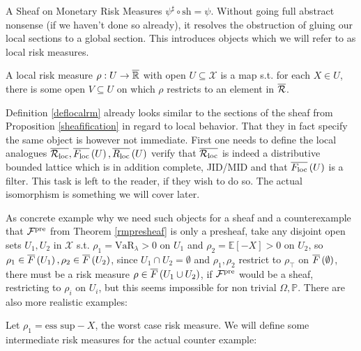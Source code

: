 \begin{subsection}{A Sheaf on Monetary Risk Measures}
    \( \psi^\sharp \circ \text{sh} = \psi \).
    Without going full abstract nonsense (if we haven't done so already),
    it resolves the obstruction of gluing our local sections to a global section. This introduces objects which we will refer to as local risk measures.
    \begin{definition} \label{deflocalrm}
        A local risk measure \( \rho : U \to \overline{\mathbb{R}} \) with open \( U \subseteq \mathcal{X} \) is a map 
        s.t. for each \( X \in U \), there is some open \( V \subseteq U \) on which \( \rho \)  restricts to an element in \( \overline{\mathcal{R}} \).
    \end{definition}
    \begin{remark} \label{analoglocalrm}
        Definition \ref{deflocalrm} already looks similar to the sections of the sheaf from Proposition \ref{sheafification}
        in regard to local behavior. That they in fact specify the same object is however not immediate.
        First one needs to define the local analogues \( \overline{\mathcal{R}_{\text{loc}}}, \overline{F_{\text{loc}}}\left (U \right), \overline{R_{\text{loc}}}\left (U \right) \) verify 
        that \( \overline{\mathcal{R}_{\text{loc}}} \) is indeed a distributive bounded lattice which is in addition complete, JID/MID
        and that \( \overline{F_{\text{loc}}}\left (U \right) \) is a filter. This task is left to the reader, if they wish to do so.
        The actual isomorphism is something we will cover later.
    \end{remark}
    As concrete example why we need such objects for a sheaf and a counterexample that \( \mathcal{F}^{\text{pre}} \) from Theorem \ref{rmpresheaf}
    is only a presheaf, take any disjoint open sets \( U_1, U_2 \) in \( \mathcal{X} \) s.t. \( \rho_1 = \text{VaR}_{\lambda} > 0 \) on \( U_1 \) and 
    \( \rho_2 = \mathbb{E}[-X] > 0 \) on \( U_2 \), so \( \rho_1 \in \overline{F}\left (U_1 \right), \rho_2 \in \overline{F}\left (U_2 \right) \), since \( U_1 \cap U_2 = \emptyset \) and \( \rho_1, \rho_2 \) 
    restrict to \( \rho_{\top} \) on \( \overline{F}\left (\emptyset \right) \), there must be a risk measure \( \rho \in \overline{F}\left (U_1 \cup U_2 \right) \), if \( \mathcal{F}^{\text{pre}} \) would be a sheaf, 
    restricting to \( \rho_i \) on \( U_i \), but this seems impossible for non trivial \( \Omega, \mathbb{P} \). There are also more realistic examples:
    \begin{example}
        Let \( \rho_1 = \text{ess sup} - X \), the worst case risk measure. We will define some intermediate 
        risk measures for the actual counter example:
        \begin{align*}

\end{align*}
\end{example}
\end{subsection}
